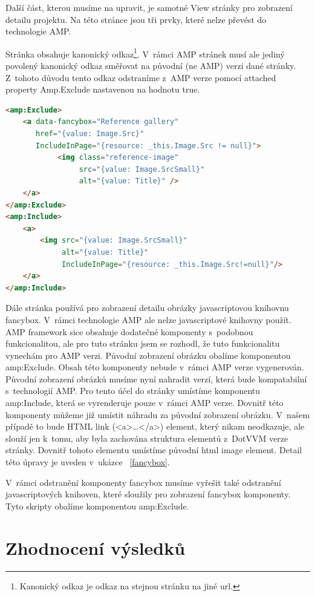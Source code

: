 Další část, kterou musíme na upravit, je samotné View stránky pro zobrazení detailu projektu. Na této stránce jsou tři prvky, které nelze převést do technologie AMP.

Stránka obsahuje kanonický odkaz\footnote{Kanonický odkaz je odkaz na stejnou stránku na jiné url.}. V~rámci AMP stránek musí ale jediný povolený kanonický odkaz směřovat na původní (ne AMP) verzi dané stránky. Z~tohoto důvodu tento odkaz odstraníme z~AMP verze pomocí attached property Amp.Exclude nastavenou na hodnotu true.

\begin{lstlisting}[language=html, caption=Odstranění komponenty fancybox.,label=fancybox,captionpos=t]
<amp:Exclude>
	<a data-fancybox="Reference gallery"
	   href="{value: Image.Src}"
	   IncludeInPage="{resource: _this.Image.Src != null}">
	        <img class="reference-image"
	             src="{value: Image.SrcSmall}"
	             alt="{value: Title}" />
	</a>
</amp:Exclude>
<amp:Include>
	<a>
		<img src="{value: Image.SrcSmall}"
		     alt="{value: Title}"
		     IncludeInPage="{resource: _this.Image.Src!=null}"/>
	</a>
</amp:Include>

\end{lstlisting}

Dále stránka používá pro zobrazení detailu obrázky javascriptovou knihovnu fancybox. V~rámci technologie AMP ale nelze javascriptové knihovny použít. AMP framework sice obsahuje dodatečné komponenty s~podobnou funkcionalitou, ale pro tuto stránku jsem se rozhodl, že tuto funkcionalitu vynechám pro AMP verzi. Původní zobrazení obrázku obalíme komponentou amp:Exclude. Obsah této komponenty nebude v~rámci AMP verze vygenerován. Původní zobrazení obrázků musíme nyní nahradit verzí, která bude kompatabilní s~technologií AMP. Pro tento účel do stránky umístíme komponentu amp:Include, která se vyrenderuje pouze v~rámci AMP verze. Dovnitř této komponenty můžeme již umístit náhradu za původní zobrazení obrázku. V~našem případě to bude HTML link (<a>\ldots</a>) element, který nikam neodkazuje, ale slouží jen k~tomu, aby byla zachována struktura elementů z~DotVVM verze stránky. Dovnitř tohoto elementu umístíme původní html image element. Detail této úpravy je uveden v~ukázce ~\ref{fancybox}.

V~rámci odstranění komponenty fancybox musíme vyřešit také odstranění javascriptových knihoven, které sloužily pro zobrazení fancybox komponenty. Tyto skripty obalíme komponentou amp:Exclude.

\section{Zhodnocení výsledků}

